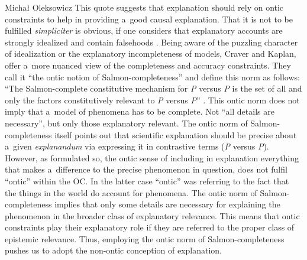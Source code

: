 \begin{artengenv}{Michał Oleksowicz}
This quote suggests that explanation should rely on ontic constraints to help in providing a~good causal explanation. That it is not to be fulfilled \textit{simpliciter} is obvious, if one considers that explanatory accounts are strongly idealized and contain falsehoods
\parencite[][]{potochnik_idealization_2017}. %
 Being aware of the puzzling character of idealization or the explanatory incompleteness of models, Craver and Kaplan, offer a~more nuanced view of the completeness and accuracy constraints. They call it ``the ontic notion of Salmon-completeness'' and define this norm as follows: ``The Salmon-complete constitutive mechanism for \textit{P} versus \textit{P{\textasciigrave}} is the set of all and only the factors constitutively relevant to \textit{P} versus \textit{P{\textasciigrave}}'' 
\parencite[][p.300]{craver_are_2020}. %
 This ontic norm does not imply that a~model of phenomena has to be complete. Not ``all details are necessary'', but only those explanatory relevant. The ontic norm of Salmon-completeness itself points out that scientific explanation should be precise about a~given \textit{explanandum} via expressing it in contrastive terms (\textit{P} versus \textit{P{\textasciigrave}}). However, as formulated so, the ontic sense of including in explanation everything that makes a~difference to the precise phenomenon in question, does not fulfil ``ontic'' within the OC. In the latter case ``ontic'' was referring to the fact that the things in the world do account for phenomena. The ontic norm of Salmon-completeness implies that only some details are necessary for explaining the phenomenon in the broader class of explanatory relevance. This means that ontic constraints play their explanatory role if they are referred to the proper class of epistemic relevance. Thus, employing the ontic norm of Salmon-completeness pushes us to adopt the non-ontic conception of explanation.


\end{artengenv}
